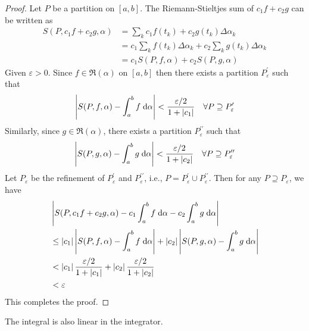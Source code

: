 \documentclass[thmcnt=section, 12pt]{my-elegantbook}
\begin{document}
\begin{proof}
    Let $P$ be a partition on $[a,b]$. The Riemann-Stieltjes sum of $c_1 f + c_2 g$ can be written as 
    \begin{align*}
        S(P, c_1 f + c_2 g, \alpha)
        &= \sum_{k} c_1 f(t_k) + c_2 g(t_k) \Delta\alpha_k \\ 
        &= c_1 \sum_{k} f(t_k) \Delta\alpha_k
        + c_2 \sum_{k} g(t_k) \Delta\alpha_k \\ 
        &= c_1 S(P, f, \alpha) + c_2 S(P, g, \alpha)
    \end{align*}
    Given $\varepsilon > 0$. Since $f \in \mathfrak{R}(\alpha)$ on $[a,b]$ then there exists a partition $P_\varepsilon^{\prime}$
    such that 
    \begin{align*}
        \left\lvert S(P, f, \alpha) - \int_a^b f \; \mathrm{d}\alpha \right\rvert < \frac{\varepsilon / 2}{1 + \left\lvert c_1 \right\rvert}
        \quad \forall P \supseteq P_\varepsilon^{\prime}
    \end{align*}
    Similarly, since $g \in \mathfrak{R}(\alpha)$, there exists a partition $P_\varepsilon^{\prime\prime}$ such that 
    \begin{align*}
        \left\lvert S(P, g, \alpha) - \int_a^b g \; \mathrm{d}\alpha \right\rvert < \frac{\varepsilon / 2}{1 + \left\lvert c_2 \right\rvert}
        \quad \forall P \supseteq P_\varepsilon^{\prime\prime}
    \end{align*}
    Let $P_\varepsilon$ be the refinement of $P_\varepsilon^{\prime}$ and $P_\varepsilon^{\prime\prime}$, i.e., $P = P_\varepsilon^{\prime} \cup P_\varepsilon^{\prime\prime}$. Then for any $P \supseteq P_\varepsilon$, we have 
    \begin{align*}
        &\left\lvert 
            S(P, c_1 f + c_2 g, \alpha) 
            - c_1 \int_a^b f \; \mathrm{d}\alpha
            - c_2 \int_a^b g \; \mathrm{d}\alpha
         \right\rvert \\
        &\leq \left\lvert c_1 \right\rvert \left\lvert S(P,f,\alpha) - \int_a^b f \; \mathrm{d}\alpha \right\rvert
        + \left\lvert c_2 \right\rvert \left\lvert S(P,g,\alpha) - \int_a^b g \; \mathrm{d}\alpha \right\rvert \\ 
        &< \left\lvert c_1 \right\rvert \frac{\varepsilon / 2}{1 + \left\lvert c_1 \right\rvert}
        + \left\lvert c_2 \right\rvert \frac{\varepsilon / 2}{1 + \left\lvert c_2 \right\rvert} \\ 
        &< \varepsilon
    \end{align*}
    This completes the proof.
\end{proof}


\par The integral is also linear in the integrator.
\end{document}
